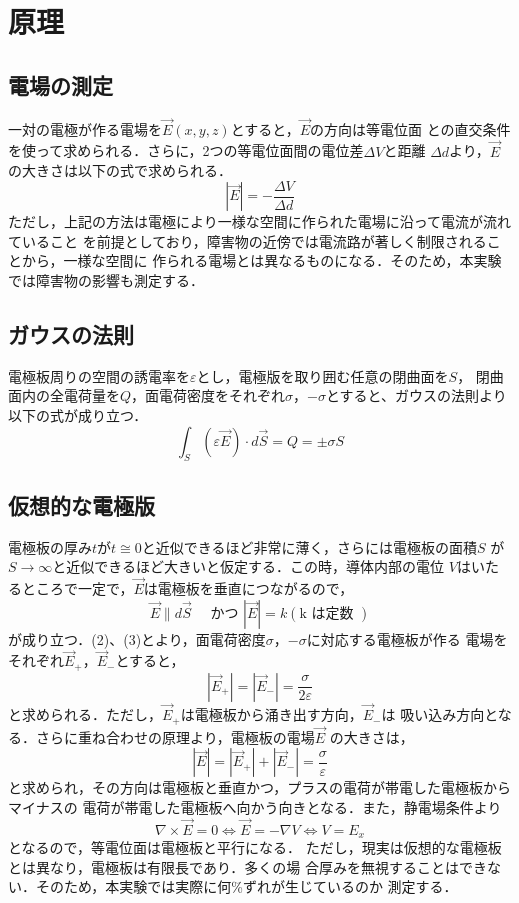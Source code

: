 
\section{原理}

\subsection{電場の測定}
一対の電極が作る電場を$\vec{E}(x, y, z)$とすると，$\vec{E}$の方向は等電位面
との直交条件を使って求められる．さらに，2つの等電位面間の電位差$\Delta V$と距離
$\Delta d$より，$\vec{E}$の大きさは以下の式で求められる．
$$
|\vec{E}|=-\frac{\Delta V}{\Delta d}
$$
ただし，上記の方法は電極により一様な空間に作られた電場に沿って電流が流れていること
を前提としており，障害物の近傍では電流路が著しく制限されることから，一様な空間に
作られる電場とは異なるものになる．そのため，本実験では障害物の影響も測定する．

\subsection{ガウスの法則}
電極板周りの空間の誘電率を$\varepsilon$とし，電極版を取り囲む任意の閉曲面を$S$，
閉曲面内の全電荷量を$Q$，面電荷密度をそれぞれ$\sigma$，$-\sigma$とすると、ガウスの法則より以下の式が成り立つ．
$$
\int_S(\varepsilon \vec{E}) \cdot d \vec{S}=Q=\pm \sigma S
$$

\subsection{仮想的な電極版}
電極板の厚み$t$が$t\cong 0$と近似できるほど非常に薄く，さらには電極板の面積$S$
が$S \rightarrow \infty$と近似できるほど大きいと仮定する．この時，導体内部の電位
$V$はいたるところで一定で，$\vec{E}$は電極板を垂直につながるので，
$$
\vec{E} \| d \vec{S} \quad \text { かつ }|\vec{E}|=k(\mathrm{k} \text { は定数 })
$$
が成り立つ．(2)、(3)とより，面電荷密度$\sigma$，$-\sigma$に対応する電極板が作る
電場をそれぞれ$\vec{E}_{+}$，$\vec{E}_{-}$とすると，
$$
\left|\vec{E}_{+}\right|=\left|\vec{E}_{-}\right|=\frac{\sigma}{2 \varepsilon}
$$
と求められる．ただし，$\vec{E}_{+}$は電極板から涌き出す方向，$\vec{E}_{-}$は
吸い込み方向となる．さらに重ね合わせの原理より，電極板の電場$\vec{E}$ の大きさは，
$$
|\vec{E}|=\left|\vec{E}_{+}\right|+\left|\vec{E}_{-}\right|=\frac{\sigma}{\varepsilon}
$$
と求められ，その方向は電極板と垂直かつ，プラスの電荷が帯電した電極板からマイナスの
電荷が帯電した電極板へ向かう向きとなる．また，静電場条件より
$$
\nabla \times \vec{E}=0 \Leftrightarrow \vec{E}=-\nabla V \Leftrightarrow V=E_x
$$
となるので，等電位面は電極板と平行になる．
ただし，現実は仮想的な電極板とは異なり，電極板は有限長であり．多くの場
合厚みを無視することはできない．そのため，本実験では実際に何\%ずれが生じているのか
測定する．